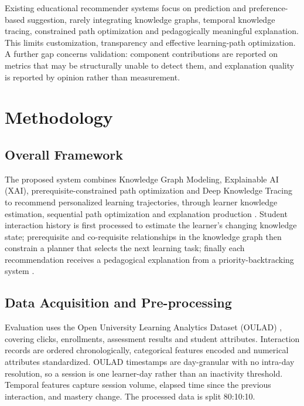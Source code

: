 Existing educational recommender systems focus on prediction and preference-based
suggestion, rarely integrating knowledge graphs, temporal knowledge tracing, constrained
path optimization and pedagogically meaningful explanation. This limits customization,
transparency and effective learning-path optimization. A further gap concerns validation:
component contributions are reported on metrics that may be structurally unable to detect
them, and explanation quality is reported by opinion rather than measurement.

\section{Methodology}
\label{sec:method}


\subsection{Overall Framework}

The proposed system combines Knowledge Graph Modeling, Explainable AI (XAI),
prerequisite-constrained path optimization and Deep Knowledge Tracing to recommend
personalized learning trajectories, through learner knowledge estimation, sequential path
optimization and explanation production \cite{piech2015dkt}. Student interaction history is
first processed to estimate the learner's changing knowledge state; prerequisite and
co-requisite relationships in the knowledge graph then constrain a planner that selects
the next learning task; finally each recommendation receives a pedagogical explanation
from a priority-backtracking system \cite{zhang2023finegrained}.

\subsection{Data Acquisition and Pre-processing}

Evaluation uses the Open University Learning Analytics Dataset (OULAD)
\cite{kuzilek2017oulad}, covering clicks, enrollments, assessment results and student
attributes. Interaction records are ordered chronologically, categorical features encoded
and numerical attributes standardized. OULAD timestamps are day-granular with no intra-day
resolution, so a session is one learner-day rather than an inactivity threshold. Temporal
features capture session volume, elapsed time since the previous interaction, and mastery
change. The processed data is split 80:10:10.

